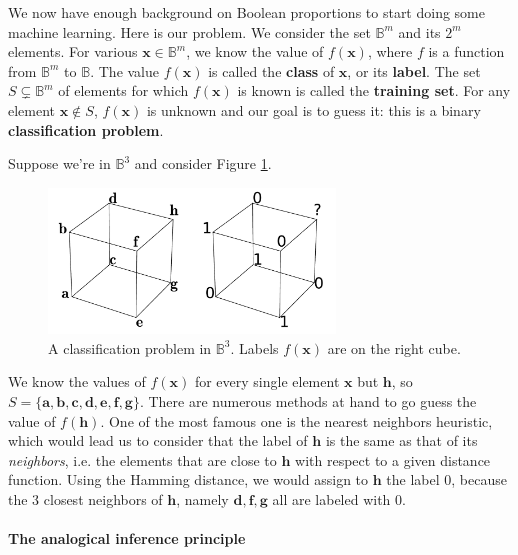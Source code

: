 We now have enough background on Boolean proportions to start doing some
machine learning. Here is our problem. We consider the set $\mathbb{B}^m$ and
its $2^m$ elements. For various $\mathbf{x} \in \mathbb{B}^m$, we know the
value of $f(\mathbf{x})$, where $f$ is a function from $\mathbb{B}^m$ to
$\mathbb{B}$.  The value $f(\mathbf{x})$ is called the \textbf{class} of
$\mathbf{x}$, or its \textbf{label}. The set $S \subsetneq \mathbb{B}^m$ of
elements for which $f(\mathbf{x})$ is known is called the \textbf{training
set}. For any element $\mathbf{x} \notin S$, $f(\mathbf{x})$ is unknown and our
goal is to guess it: this is a binary \textbf{classification problem}.

Suppose we're in $\mathbb{B}^3$ and consider Figure
\ref{FIG:classification_problem}.
\begin{figure}[!h]
\centering
  \includegraphics[width=3in]{figures/classification_problem.pdf}
  \caption{A classification problem in $\mathbb{B}^3$. Labels $f(\mathbf{x})$
  are on the right cube.}
\label{FIG:classification_problem}
\end{figure}
We know the values of $f(\mathbf{x})$ for
every single element $\mathbf{x}$ but $\mathbf{h}$, so $S = \{ \mathbf{a}, \mathbf{b},
\mathbf{c}, \mathbf{d}, \mathbf{e}, \mathbf{f}, \mathbf{g}\}$. There are
numerous methods at hand to go guess the value of $f(\mathbf{h})$. One of the
most famous one is the nearest neighbors heuristic, which would lead us to
consider that the label of $\mathbf{h}$ is the same as  that of its
\textit{neighbors}, i.e. the elements that are close to $\mathbf{h}$ with
respect to a given distance function. Using the Hamming distance, we would
assign to $\mathbf{h}$ the label $0$, because the $3$ closest neighbors of
$\mathbf{h}$, namely $\mathbf{d}, \mathbf{f}, \mathbf{g}$ all are labeled with
$0$.

\paragraph{The analogical inference principle\\}

